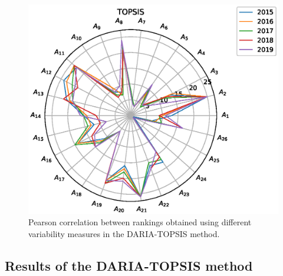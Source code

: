 \documentclass[final,5p,times,twocolumn,authoryear]{elsarticle}
\begin{document}
\begin{figure}[H]
    \centering
    \includegraphics[width=\linewidth]{radar_topsis.eps}
    \caption{Pearson correlation between rankings obtained using different variability measures in the DARIA-TOPSIS method.}
    \label{fig:radarTOPSIS}
\end{figure}

\subsection{Results of the DARIA-TOPSIS method}
\end{document}

